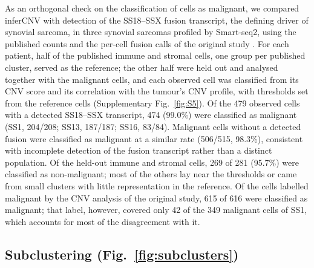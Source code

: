 As an orthogonal check on the classification of cells as malignant, we compared inferCNV with detection of the SS18--SSX fusion transcript, the defining driver of synovial sarcoma, in three synovial sarcomas profiled by Smart-seq2, using the published counts and the per-cell fusion calls of the original study \citep{jerbyarnon2021}. For each patient, half of the published immune and stromal cells, one group per published cluster, served as the reference; the other half were held out and analysed together with the malignant cells, and each observed cell was classified from its CNV score and its correlation with the tumour's CNV profile, with thresholds set from the reference cells (Supplementary Fig.~\ref{fig:S5}). Of the 479 observed cells with a detected SS18--SSX transcript, 474 (99.0\%) were classified as malignant (SS1, 204/208; SS13, 187/187; SS16, 83/84). Malignant cells without a detected fusion were classified as malignant at a similar rate (506/515, 98.3\%), consistent with incomplete detection of the fusion transcript rather than a distinct population. Of the held-out immune and stromal cells, 269 of 281 (95.7\%) were classified as non-malignant; most of the others lay near the thresholds or came from small clusters with little representation in the reference. Of the cells labelled malignant by the CNV analysis of the original study, 615 of 616 were classified as malignant; that label, however, covered only 42 of the 349 malignant cells of SS1, which accounts for most of the disagreement with it.

\subsection{Subclustering (Fig.~\ref{fig:subclusters})}

